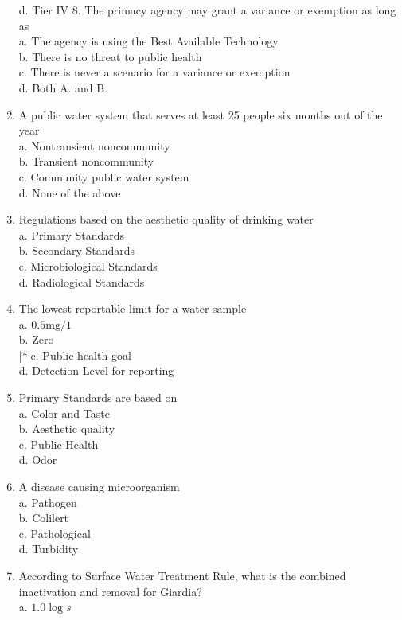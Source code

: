 \begin{enumerate}
d. Tier IV 8. The primacy agency may grant a variance or exemption as long as\\
a. The agency is using the Best Available Technology\\
b. There is no threat to public health\\
c. There is never a scenario for a variance or exemption\\
d. Both A. and B.\\
\item A public water system that serves at least 25 people six months out of the year\\
a. Nontransient noncommunity\\
b. Transient noncommunity\\
c. Community public water system\\
d. None of the above\\
\item Regulations based on the aesthetic quality of drinking water\\
a. Primary Standards\\
b. Secondary Standards\\
c. Microbiological Standards\\
d. Radiological Standards\\
\item The lowest reportable limit for a water sample\\
a. $0.5 \mathrm{mg} / 1$\\
b. Zero\\
|*|c. Public health goal\\
d. Detection Level for reporting\\
\item Primary Standards are based on\\
a. Color and Taste\\
b. Aesthetic quality\\
c. Public Health\\
d. Odor\\
\item A disease causing microorganism\\
a. Pathogen\\
b. Colilert\\
c. Pathological\\
d. Turbidity\\
\item According to Surface Water Treatment Rule, what is the combined inactivation and removal for Giardia?\\
a. $1.0 \log s$\\

\end{enumerate}
